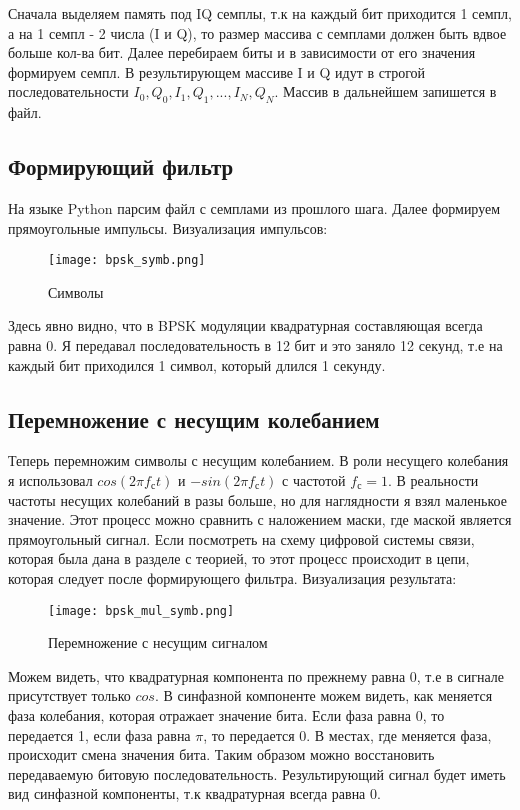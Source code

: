 Сначала выделяем память под IQ семплы, т.к на каждый бит приходится 1 семпл, а на 1 семпл - 2 числа (I и Q), то размер массива 
с семплами должен быть вдвое больше кол-ва бит. Далее перебираем биты и в зависимости от его значения формируем семпл. В результирующем
массиве I и Q идут в строгой последовательности $I_0,Q_0,I_1,Q_1,...,I_N,Q_N$. Массив в дальнейшем запишется в файл.

\subsection*{\textbf{Формирующий фильтр}}

На языке Python парсим файл с семплами из прошлого шага. Далее формируем прямоугольные импульсы. Визуализация импульсов:

\begin{figure}[H]
    \centering
    \texttt{[image: bpsk\_symb.png]}
    \caption{Символы}
\end{figure}

Здесь явно видно, что в BPSK модуляции квадратурная составляющая всегда равна 0. Я передавал последовательность в 12 бит и это
заняло 12 секунд, т.е на каждый бит приходился 1 символ, который длился 1 секунду.

\subsection*{\textbf{Перемножение с несущим колебанием}}

Теперь перемножим символы с несущим колебанием. В роли несущего колебания я использовал $cos(2\pi f_сt)$ и $-sin(2\pi f_сt)$ с частотой
$f_с = 1$. В реальности частоты несущих колебаний в разы больше, но для наглядности я взял маленькое значение. Этот процесс можно
сравнить с наложением маски, где маской является прямоугольный сигнал. Если посмотреть на схему цифровой системы связи, которая
была дана в разделе с теорией, то этот процесс происходит в цепи, которая следует после формирующего фильтра. Визуализация результата:

\begin{figure}[H]
    \centering
    \texttt{[image: bpsk\_mul\_symb.png]}
    \caption{Перемножение с несущим сигналом}
\end{figure}

Можем видеть, что квадратурная компонента по прежнему равна 0, т.е в сигнале присутствует только $cos$. В синфазной компоненте
можем видеть, как меняется фаза колебания, которая отражает значение бита. Если фаза равна 0, то передается 1, если фаза равна $\pi$,
то передается 0. В местах, где меняется фаза, происходит смена значения бита. Таким образом можно восстановить передаваемую битовую
последовательность. Результирующий сигнал будет иметь вид синфазной компоненты, т.к квадратурная всегда равна 0.


